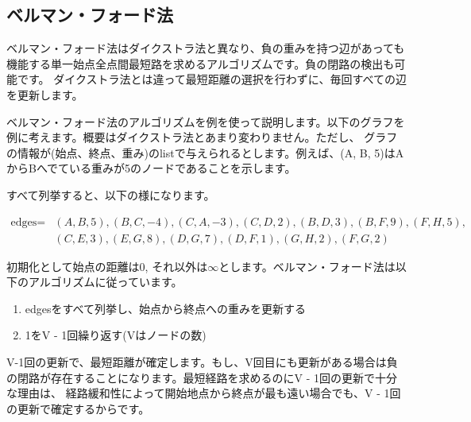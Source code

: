 \newpage

\subsection{ベルマン・フォード法}
ベルマン・フォード法はダイクストラ法と異なり、負の重みを持つ辺があっても機能する単一始点全点間最短路を求めるアルゴリズムです。負の閉路の検出も可能です。
ダイクストラ法とは違って最短距離の選択を行わずに、毎回すべての辺を更新します。

ベルマン・フォード法のアルゴリズムを例を使って説明します。以下のグラフを例に考えます。概要はダイクストラ法とあまり変わりません。ただし、
グラフの情報が(始点、終点、重み)のlistで与えられるとします。例えば、(A, B, 5)はAからBへでている重みが5のノードであることを示します。

すべて列挙すると、以下の様になります。

\begin{equation*}
  \begin{aligned}
    \text{edges} =
    &(A, B, 5), (B, C, -4), (C, A, -3), (C, D, 2), (B, D, 3), (B, F, 9), (F, H, 5), \\
    &(C, E, 3), (E, G, 8), (D, G, 7), (D, F, 1), (G, H, 2), (F, G, 2)
  \end{aligned}
\end{equation*}

初期化として始点の距離は0, それ以外は$\infty$とします。ベルマン・フォード法は以下のアルゴリズムに従っています。

\begin{enumerate}
  \item edgesをすべて列挙し、始点から終点への重みを更新する
  \item 1をV - 1回繰り返す(Vはノードの数)
\end{enumerate}

V-1回の更新で、最短距離が確定します。もし、V回目にも更新がある場合は負の閉路が存在することになります。最短経路を求めるのにV - 1回の更新で十分な理由は、
経路緩和性によって開始地点から終点が最も遠い場合でも、V - 1回の更新で確定するからです。

